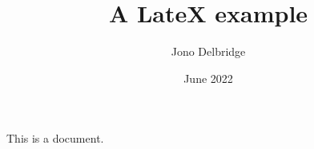 \documentclass{article}
\title{A LateX example}
\author{Jono Delbridge}
\date{June 2022}
\begin{document}
\maketitle

This is a document.
\end{document}
